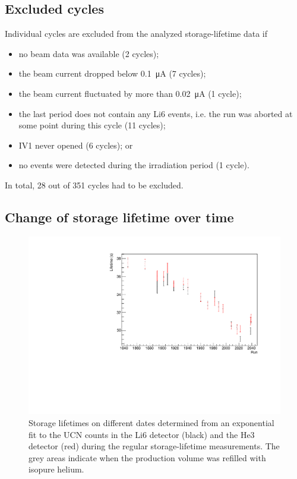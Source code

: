 \documentclass[10pt,letterpaper]{article}
\begin{document}
\subsection{Excluded cycles}

Individual cycles are excluded from the analyzed storage-lifetime data if
\begin{itemize}
\item no beam data was available (2 cycles);
\item the beam current dropped below \SI{0.1}{\micro\ampere} (7 cycles);
\item the beam current fluctuated by more than \SI{0.02}{\micro\ampere} (1 cycle);
\item the last period does not contain any Li6 events, i.e. the run was aborted at some point during this cycle (11 cycles);
\item IV1 never opened (6 cycles); or
\item no events were detected during the irradiation period (1 cycle).
\end{itemize}

In total, 28 out of 351 cycles had to be excluded.

\subsection{Change of storage lifetime over time}

\begin{figure}
\centering
\includegraphics[width=\textwidth,page=2]{../storagelifetime/dailytau.pdf}
\caption{Storage lifetimes on different dates determined from an exponential fit to the UCN counts in the Li6 detector (black) and the He3 detector (red) during the regular storage-lifetime measurements. The grey areas indicate when the production volume was refilled with isopure helium.}
\label{fig:dailytau}
\end{figure}
\end{document}
